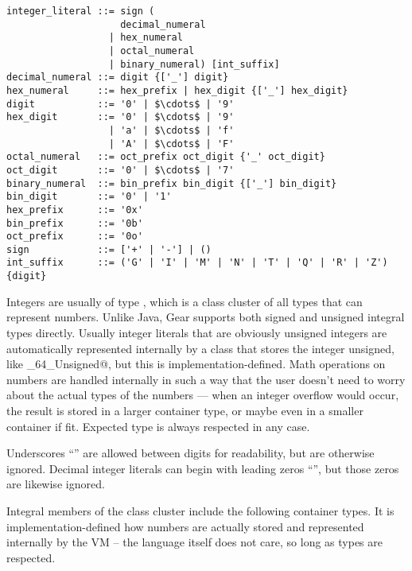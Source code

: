 \syntax\begin{lstlisting}
integer_literal ::= sign (
                    decimal_numeral
                  | hex_numeral
                  | octal_numeral
                  | binary_numeral) [int_suffix]
decimal_numeral ::= digit {['_'] digit}
hex_numeral     ::= hex_prefix | hex_digit {['_'] hex_digit}
digit           ::= '0' | $\cdots$ | '9'
hex_digit       ::= '0' | $\cdots$ | '9' 
                  | 'a' | $\cdots$ | 'f'
                  | 'A' | $\cdots$ | 'F'
octal_numeral   ::= oct_prefix oct_digit {'_' oct_digit}
oct_digit       ::= '0' | $\cdots$ | '7'
binary_numeral  ::= bin_prefix bin_digit {['_'] bin_digit}
bin_digit       ::= '0' | '1'
hex_prefix      ::= '0x'
bin_prefix      ::= '0b'
oct_prefix      ::= '0o'
sign            ::= ['+' | '-'] | ()
int_suffix      ::= ('G' | 'I' | 'M' | 'N' | 'T' | 'Q' | 'R' | 'Z') {digit}
\end{lstlisting}

Integers are usually of type \lstinline@Number@, which is a class cluster of all types that can represent numbers. Unlike Java, Gear supports both signed and unsigned integral types directly. Usually integer literals that are obviously unsigned integers are automatically represented internally by a class that stores the integer unsigned, like \lstinline@Integer_64_Unsigned@, but this is implementation-defined. Math operations on numbers are handled internally in such a way that the user doesn't need to worry about the actual types of the numbers — when an integer overflow would occur, the result is stored in a larger container type, or maybe even in a smaller container if fit. Expected type is always respected in any case. 

Underscores ``\code{_}'' are allowed between digits for readability, but are otherwise ignored. Decimal integer literals can begin with leading zeros ``'', but those zeros are likewise ignored. 

Integral members of the \lstinline@Number@ class cluster include the following container types. It is implementation-defined how numbers are actually stored and represented internally by the VM -- the language itself does not care, so long as types are respected. 

